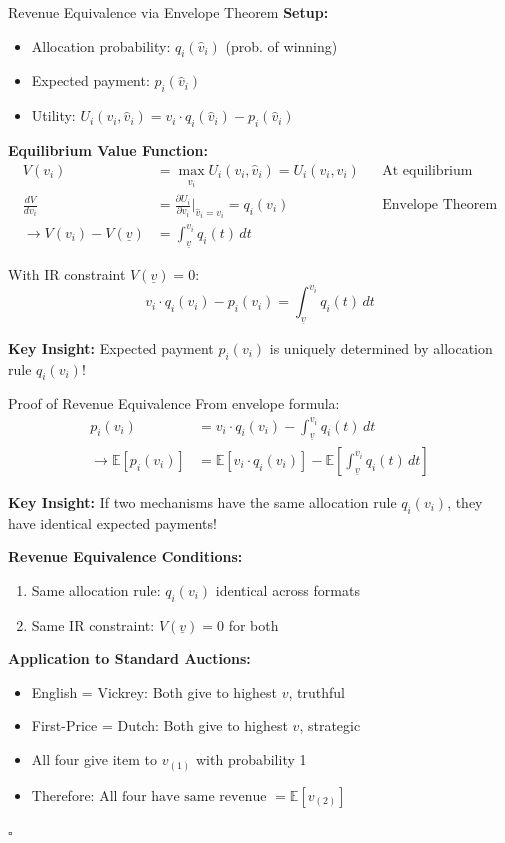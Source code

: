\documentclass[xcolor={x11names}, aspectratio=169 ]{beamer}
\newcommand{\E}{\mathbb{E}}
\begin{document}
\begin{frame}{Revenue Equivalence via Envelope Theorem}
\textbf{Setup:}
\begin{itemize}
  \item Allocation probability: $q_i(\hat{v}_i)$ (prob. of winning)
  \item Expected payment: $p_i(\hat{v}_i)$
  \item Utility: $U_i(v_i, \hat{v}_i) = v_i \cdot q_i(\hat{v}_i) - p_i(\hat{v}_i)$
\end{itemize}

\textbf{Equilibrium Value Function:}
\begin{align*}
V(v_i) &= \max_{\hat{v}_i} U_i(v_i, \hat{v}_i) = U_i(v_i, v_i) && \text{At equilibrium} \\
\frac{dV}{dv_i} &= \frac{\partial U_i}{\partial v_i}\Big|_{\hat{v}_i = v_i} = q_i(v_i) && \text{Envelope Theorem} \\
\rightarrow V(v_i) - V(\underline{v}) &= \int_{\underline{v}}^{v_i} q_i(t) \, dt &&
\end{align*}

With IR constraint $V(\underline{v}) = 0$:
$$\boxed{v_i \cdot q_i(v_i) - p_i(v_i) = \int_{\underline{v}}^{v_i} q_i(t) \, dt}$$

\textbf{Key Insight:} Expected payment $p_i(v_i)$ is uniquely determined by allocation rule $q_i(v_i)$!
\end{frame}

\begin{frame}{Proof of Revenue Equivalence}
From envelope formula:
\begin{align*}
p_i(v_i) &= v_i \cdot q_i(v_i) - \int_{\underline{v}}^{v_i} q_i(t) \, dt \\
\rightarrow \E[p_i(v_i)] &= \E[v_i \cdot q_i(v_i)] - \E\left[\int_{\underline{v}}^{v_i} q_i(t) \, dt\right]
\end{align*}

\textbf{Key Insight:} If two mechanisms have the same allocation rule $q_i(v_i)$, they have identical expected payments!

\textbf{Revenue Equivalence Conditions:}
\begin{enumerate}
  \item Same allocation rule: $q_i(v_i)$ identical across formats
  \item Same IR constraint: $V(\underline{v}) = 0$ for both
\end{enumerate}

\textbf{Application to Standard Auctions:}
\begin{itemize}
  \item English = Vickrey: Both give to highest $v$, truthful
  \item First-Price = Dutch: Both give to highest $v$, strategic
  \item All four give item to $v_{(1)}$ with probability 1
  \item Therefore: $\boxed{\text{All four have same revenue } = \E[v_{(2)}]}$
\end{itemize}
$\square$
\end{frame}
\end{document}

